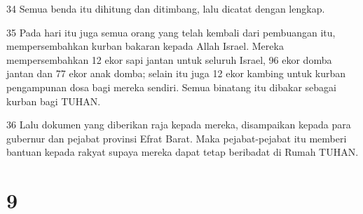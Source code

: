 \par 34 Semua benda itu dihitung dan ditimbang, lalu dicatat dengan lengkap.
\par 35 Pada hari itu juga semua orang yang telah kembali dari pembuangan itu, mempersembahkan kurban bakaran kepada Allah Israel. Mereka mempersembahkan 12 ekor sapi jantan untuk seluruh Israel, 96 ekor domba jantan dan 77 ekor anak domba; selain itu juga 12 ekor kambing untuk kurban pengampunan dosa bagi mereka sendiri. Semua binatang itu dibakar sebagai kurban bagi TUHAN.
\par 36 Lalu dokumen yang diberikan raja kepada mereka, disampaikan kepada para gubernur dan pejabat provinsi Efrat Barat. Maka pejabat-pejabat itu memberi bantuan kepada rakyat supaya mereka dapat tetap beribadat di Rumah TUHAN.

\chapter{9}


